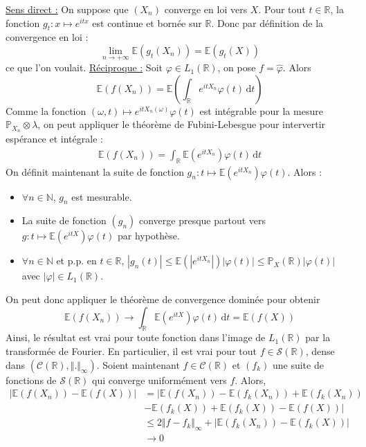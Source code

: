 	\begin{demonstration}
		\underline{Sens direct :} On suppose que $(X_n)$ converge en loi vers $X$. Pour tout $t \in \mathbb{R}$, la fonction $g_t : x \mapsto e^{itx}$ est continue et bornée sur $\mathbb{R}$. Donc par définition de la convergence en loi :
		\[ \lim_{n \rightarrow +\infty} \mathbb{E}(g_t(X_n)) = \mathbb{E}(g_t(X)) \]
		ce que l'on voulait.
		\newpar
		\underline{Réciproque :} Soit $\varphi \in L_1(\mathbb{R})$, on pose $f = \widehat{\varphi}$. Alors
		\[ \mathbb{E}(f(X_n)) = \mathbb{E} \left ( \int_{\mathbb{R}} e^{itX_n} \varphi(t) \, \mathrm{d}t \right ) \]
		Comme la fonction $(\omega, t) \mapsto e^{itX_n(\omega)} \varphi(t)$ est intégrable pour la mesure $\mathbb{P}_{X_n} \otimes \lambda$, on peut appliquer le théorème de Fubini-Lebesgue pour intervertir espérance et intégrale :
		\begin{align*}
			\mathbb{E}(f(X_n)) = \int_{\mathbb{R}} \mathbb{E} (e^{itX_n}) \varphi(t) \, \mathrm{d}t
		\end{align*}
		On définit maintenant la suite de fonction $g_n : t \mapsto \mathbb{E} (e^{itX_n}) \varphi(t)$. Alors :
		\begin{itemize}
			\item $\forall n \in \mathbb{N}$, $g_n$ est mesurable.
			\item La suite de fonction $(g_n)$ converge presque partout vers $g : t \mapsto \mathbb{E} (e^{itX}) \varphi(t)$ par hypothèse.
			\item $\forall n \in \mathbb{N}$ et p.p. en $t \in \mathbb{R}$, $|g_n(t)| \leq \mathbb{E} (|e^{itX_n}|) |\varphi(t)| \leq \mathbb{P}_X(\mathbb{R}) |\varphi(t)|$ avec $|\varphi| \in L_1(\mathbb{R})$.
		\end{itemize}
		On peut donc appliquer le théorème de convergence dominée pour obtenir
		\[ \mathbb{E}(f(X_n)) \longrightarrow \int_{\mathbb{R}} \mathbb{E} (e^{itX}) \varphi(t) \, \mathrm{d}t = \mathbb{E}(f(X)) \]
		Ainsi, le résultat est vrai pour toute fonction dans l'image de $L_1(\mathbb{R})$ par la transformée de Fourier. En particulier, il est vrai pour tout $f \in \mathcal{S}(\mathbb{R})$, dense dans $(\mathcal{C}(\mathbb{R}), \Vert . \Vert_\infty)$. Soient maintenant $f \in \mathcal{C}(\mathbb{R})$ et $(f_k)$ une suite de fonctions de $\mathcal{S}(\mathbb{R})$ qui converge uniformément vers $f$. Alors,
		\begin{align*}
			|\mathbb{E}(f(X_n)) - \mathbb{E}(f(X))| &= |\mathbb{E}(f(X_n)) - \mathbb{E}(f_k(X_n)) + \mathbb{E}(f_k(X_n)) \\
			&- \mathbb{E}(f_k(X)) + \mathbb{E}(f_k(X)) - \mathbb{E}(f(X))| \\
			&\leq 2 \Vert f - f_k \Vert_\infty + |\mathbb{E}(f_k(X_n)) - \mathbb{E}(f_k(X))| \\
			&\longrightarrow 0
		\end{align*}
	\end{demonstration}

